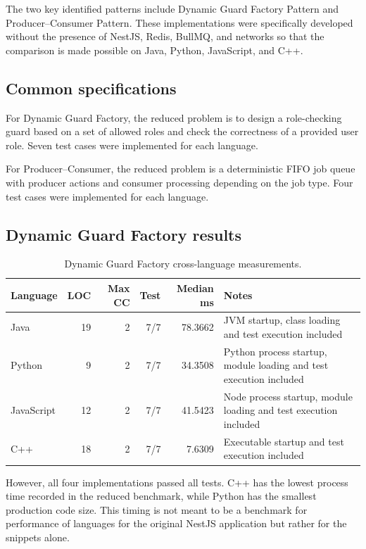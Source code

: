 \documentclass[11pt,a4paper]{article}
\begin{document}
The two key identified patterns include Dynamic Guard Factory Pattern and Producer–Consumer Pattern. These implementations were specifically developed without the presence of NestJS, Redis, BullMQ, and networks so that the comparison is made possible on Java, Python, JavaScript, and C++.

\subsection{Common specifications}
For Dynamic Guard Factory, the reduced problem is to design a role-checking guard based on a set of allowed roles and check the correctness of a provided user role. Seven test cases were implemented for each language.

For Producer–Consumer, the reduced problem is a deterministic FIFO job queue with producer actions and consumer processing depending on the job type. Four test cases were implemented for each language.

\subsection{Dynamic Guard Factory results}
\begin{table}[H]
\centering\small
\begin{tabularx}{\linewidth}{@{}lrrrrY@{}}
\toprule
Language & LOC & Max CC & Test & Median ms & Notes\\
\midrule
Java & 19 & 2 & 7/7 & 78.3662 & JVM startup, class loading and test execution included\\
Python & 9 & 2 & 7/7 & 34.3508 & Python process startup, module loading and test execution included\\
JavaScript & 12 & 2 & 7/7 & 41.5423 & Node process startup, module loading and test execution included\\
C++ & 18 & 2 & 7/7 & 7.6309 & Executable startup and test execution included\\
\bottomrule
\end{tabularx}
\caption{Dynamic Guard Factory cross-language measurements.}
\end{table}

However, all four implementations passed all tests. C++ has the lowest process time recorded in the reduced benchmark, while Python has the smallest production code size. This timing is not meant to be a benchmark for performance of languages for the original NestJS application but rather for the snippets alone.
\end{document}
